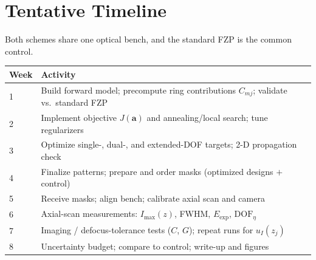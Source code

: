 \documentclass[11pt,a4paper]{article}
\begin{document}
\section{Tentative Timeline}

Both schemes share one optical bench, and the standard FZP is the common control.

\begin{center}
\small
\small\begin{tabular}{ll}
\toprule
Week & Activity \\
\midrule
1 & Build forward model; precompute ring contributions $C_{mj}$; validate vs.\ standard FZP \\
2 & Implement objective $J(\mathbf{a})$ and annealing/local search; tune regularizers \\
3 & Optimize single-, dual-, and extended-DOF targets; 2-D propagation check \\
4 & Finalize patterns; prepare and order masks (optimized designs $+$ control) \\
5 & Receive masks; align bench; calibrate axial scan and camera \\
6 & Axial-scan measurements: $I_{\max}(z)$, FWHM, $E_{\text{exp}}$, $\mathrm{DOF}_\eta$ \\
7 & Imaging / defocus-tolerance tests ($C$, $G$); repeat runs for $u_I(z_j)$ \\
8 & Uncertainty budget; compare to control; write-up and figures \\
\bottomrule
\end{tabular}
\end{center}
\end{document}
